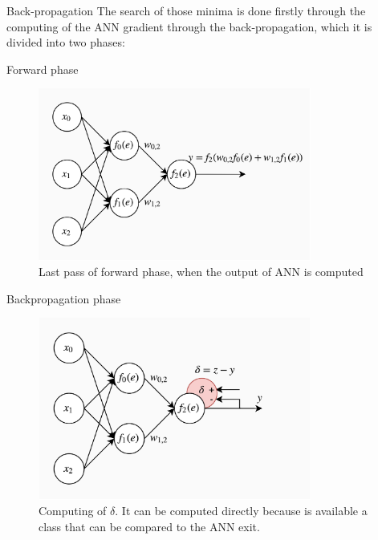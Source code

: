 \documentclass[xcolor={usenames}]{beamer}
\begin{document}
  \begin{frame}{Back-propagation}
  	The search of those minima is done firstly through the computing of the ANN gradient through the back-propagation, which it is divided into two phases:
  	\begin{itemize}
  	\end{itemize}
  \end{frame}
  \begin{frame}{Forward phase}
  	\begin{figure}
  		\centering
  		\includegraphics[width=0.8\textwidth]{../figures/forward-propagation.png}
  		\caption{Last pass of forward phase, when the output of ANN is computed}
  	\end{figure}
  \end{frame}
  \begin{frame}{Backpropagation phase}
  	\begin{figure}
  		\centering
  		\includegraphics[width=0.8\textwidth]{../figures/backward-propagation-0.png}
  		\caption{Computing of $\delta$. It can be computed directly because is available a class that can be compared to the ANN exit.}
  	\end{figure}
  \end{frame}
\end{document}
